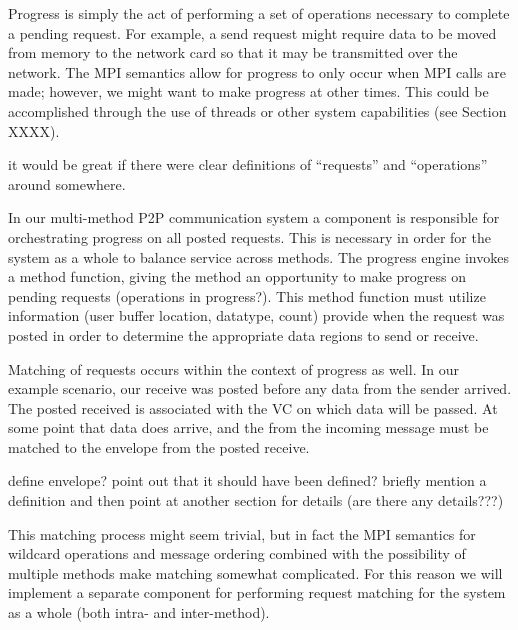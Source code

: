Progress is simply the act of performing a set of operations necessary to
complete a pending request.  For example, a send request might require data to
be moved from memory to the network card so that it may be transmitted over the
network.
%
The MPI semantics allow for progress to only occur when MPI calls
are made; however, we might want to make progress at other times.  This could
be accomplished through the use of threads or other system capabilities (see
Section XXXX).

\begin{cmt}
  it would be great if there were clear definitions of ``requests'' and
  ``operations'' around somewhere.
\end{cmt}

In our multi-method P2P communication system a  component
is responsible for orchestrating progress on all posted requests.  This is
necessary in order for the system as a whole to balance service across methods.
The progress engine invokes a method function, giving the method an opportunity
to make progress on pending requests (operations in progress?).  This method
function must utilize  information (user buffer location,
datatype, count) provide when the request was posted in order to determine the
appropriate data regions to send or receive.

Matching of requests occurs within the context of progress as well.  In our
example scenario, our receive was posted before any data from the sender
arrived.  The posted received is associated with the VC on which data will be
passed.  At some point that data does arrive, and the  from
the incoming message must be matched to the envelope from the posted receive.

\begin{cmt}
  define envelope?  point out that it should have been defined?  briefly
  mention a definition and then point at another section for details (are there
  any details???)
\end{cmt}

This matching process might seem trivial, but in fact the MPI semantics for
wildcard operations and message ordering combined with the possibility of
multiple methods make matching somewhat complicated.
For this reason we will implement a separate 
component for performing request matching for the
system as a whole (both intra- and inter-method).

% 

